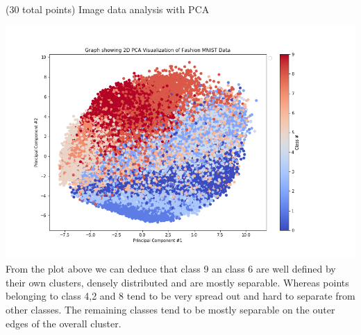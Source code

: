 \documentclass[12pt]{article}
\begin{document}
\begin{question}{(30 total points) Image data analysis with PCA}
\begin{subquestion}
   

      \begin{answerbox}{40em}
         \includegraphics[width = 1.0\textwidth]{q1_8.png}
         From the plot above we can deduce that class 9 an class 6 are well defined by their own clusters, densely distributed and are mostly separable. Whereas points belonging to class 4,2 and 8 tend to be very spread out and hard to separate from other classes. The remaining classes tend to be mostly separable on the outer edges of the overall cluster.
      \end{answerbox}
  


   \end{subquestion}
   

\end{question}
\clearpage
%
%
\end{document}
